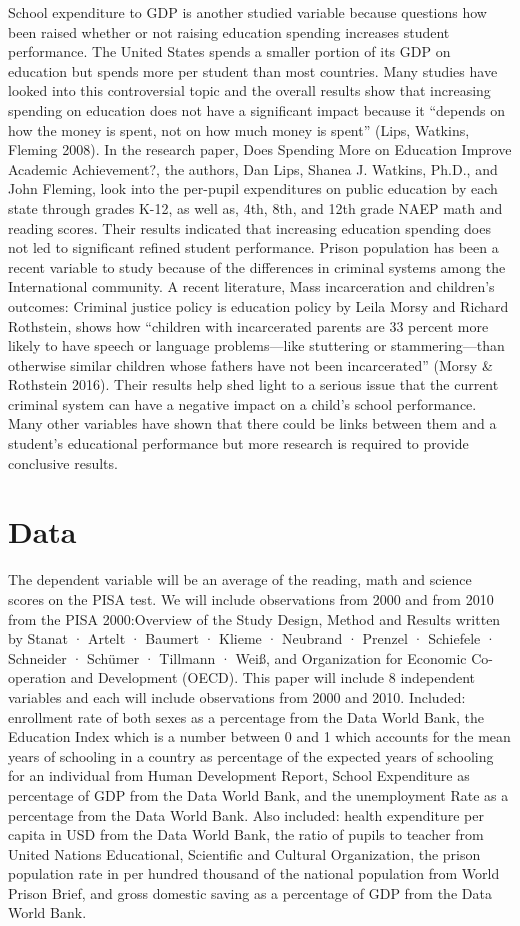 \documentclass{article}
\begin{document}
School expenditure to GDP is another studied variable because questions how been raised whether or not raising education spending increases student performance. The United States spends a smaller portion of its GDP on education but spends more per student than most countries. Many studies have looked into this controversial topic and the overall results show that increasing spending on education does not have a significant impact because it “depends on how the money is spent, not on how much money is spent” (Lips, Watkins, Fleming 2008). In the research paper, Does Spending More on Education Improve Academic Achievement?, the authors, Dan Lips, Shanea J. Watkins, Ph.D., and John Fleming, look into the per-pupil expenditures on public education by each state through grades K-12, as well as, 4th, 8th, and 12th grade NAEP math and reading scores. Their results indicated that increasing education spending does not led to significant refined student performance. Prison population has been a recent variable to study because of the differences in criminal systems among the International community. A recent literature, Mass incarceration and children’s outcomes: Criminal justice policy is education policy by Leila Morsy and Richard Rothstein, shows how “children with incarcerated parents are 33 percent more likely to have speech or language problems—like stuttering or stammering—than otherwise similar children whose fathers have not been incarcerated” (Morsy & Rothstein 2016). Their results help shed light to a serious issue that the current criminal system can have a negative impact on a child’s school performance. Many other variables have shown that there could be links between them and a student's educational performance but more research is required to provide conclusive results.

\section{Data}
The dependent variable will be an average of the reading, math and science scores on the PISA test. We will include observations from 2000 and from 2010 from the PISA 2000:Overview of the Study Design, Method and Results written by Stanat · Artelt · Baumert · Klieme · Neubrand · Prenzel · Schiefele · Schneider · Schümer · Tillmann · Weiß, and Organization for Economic Co-operation and Development (OECD). This paper will include 8 independent variables and each will include observations from 2000 and 2010. Included: enrollment rate of both sexes as a percentage from the Data World Bank, the Education Index which is a number between 0 and 1 which accounts for the mean years of schooling in a country as percentage of the expected years of schooling for an individual from Human Development Report, School Expenditure as percentage of GDP from the Data World Bank, and the unemployment Rate as a percentage from the Data World Bank. Also included: health expenditure per capita in USD from the Data World Bank, the ratio of pupils to teacher from United Nations Educational, Scientific and Cultural Organization, the prison population rate in per hundred thousand of the national population from World Prison Brief, and gross domestic saving as a percentage of GDP from the Data World Bank.
\end{document}
